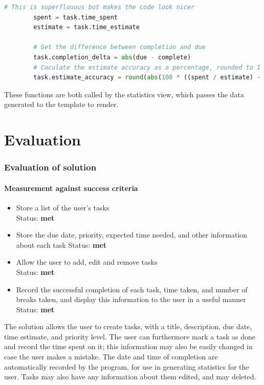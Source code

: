 \documentclass{article}
\begin{document}
\begin{lstlisting}[language=Python]
        # This is superflouous but makes the code look nicer
        spent = task.time_spent
        estimate = task.time_estimate

        # Get the difference between completion and due
        task.completion_delta = abs(due - complete)
        # Caculate the estimate accuracy as a percentage, rounded to 1 d.p.
        task.estimate_accuracy = round(abs(100 * ((spent / estimate) - 1)), 1)
\end{lstlisting}

These functions are both called by the statistics view,
which passes the data generated to the template to render.


\part{Evaluation}
\section{Evaluation of solution}
\subsection{Measurement against success criteria}
\begin{itemize}
	\item Store a list of the user's tasks\\
	      Status: \textbf{met}
	\item Store the due date, priority, expected time needed, and other information about each task
	      Status: \textbf{met}
	\item Allow the user to add, edit and remove tasks\\
	      Status: \textbf{met}
	\item Record the successful completion of each task, time taken,
	      and number of breaks taken,
	      and display this information to the user in a useful manner\\
	      Status: \textbf{met}
\end{itemize}

The solution allows the user to create tasks,
with a title, description, due date, time estimate, and priority level.
The user can furthermore mark a task as done and record the time spent on it;
this information may also be easily changed in case the user makes a mistake.
The date and time of completion are automatically recorded by the program,
for use in generating statistics for the user.
Tasks may also have any information about them edited,
and may deleted.
\end{document}
